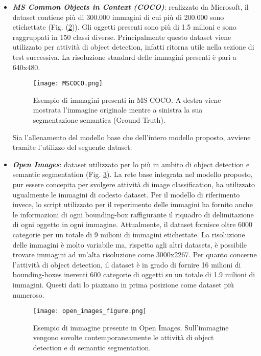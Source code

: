 \begin{itemize}
\begin{figure}
        \label{pascal}
    \end{figure} 
    \item {\bfseries{\emph{MS Common Objects in Context (COCO)}}}\cite{COCO}: realizzato da 
    Microsoft, il dataset contiene più di 300.000 immagini di cui più di 
    200.000 sono etichettate (Fig. (\ref{MSCOCO_dataset})). Gli oggetti presenti sono più di 1.5 milioni e 
    sono raggruppati in 150 classi diverse. Principalmente questo dataset 
    viene utilizzato per attività di object detection, infatti ritorna utile 
    nella sezione di test successiva. La risoluzione standard delle immagini presenti è pari a 640x480.
    \begin{figure}
        \centering
        \texttt{[image: MSCOCO.png]}
        \centering
        \caption{Esempio di immagini presenti in MS COCO. A destra viene mostrata l'immagine originale mentre a sinistra la sua segmentazione semantica (Ground Truth).}
        \label{MSCOCO_dataset}
    \end{figure} 
    Sia l'allenamento del modello base che dell'intero modello proposto, avviene tramite l'utilizzo del seguente dataset:
    \item {\bfseries{\emph{Open Images}}}\cite{OpenImages2}: dataset utilizzato per lo più in ambito di object detection e semantic segmentation (Fig. \ref{openimages_dataset}). La rete base integrata nel modello proposto, pur essere concepita per svolgere attività di image classification, ha utilizzato ugualmente le immagini di codesto dataset. Per il modello di riferimento invece, lo script utilizzato per il reperimento delle immagini ha fornito anche le informazioni di ogni bounding-box raffigurante il riquadro di delimitazione di ogni oggetto in ogni immagine. Attualmente, il dataset fornisce oltre 6000 categorie per un totale di 9 milioni di immagini etichettate. La risoluzione delle immagini è molto variabile ma, rispetto agli altri datasets, è possibile trovare immagini ad un'alta risoluzione come 3000x2267.
    Per quanto concerne l'attività di object detection, il dataset è in grado di fornire 16 milioni di bounding-boxes inerenti 600 categorie di oggetti su un totale di 1.9 milioni di immagini. Questi dati lo piazzano in prima posizione come dataset più numeroso. 
    \begin{figure}
        \centering
        \texttt{[image: open\_images\_figure.png]}
        \centering
        \caption{Esempio di immagine presente in Open Images. Sull'immagine vengono sovolte contemporaneamente le attività di object detection e di semantic segmentation.}
        \label{openimages_dataset}
    \end{figure}
\end{itemize}


